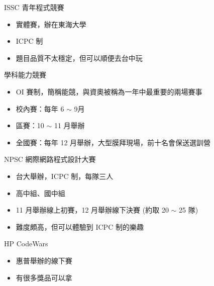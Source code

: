 \documentclass[aspectratio=169]{beamer}
\begin{document}
	\begin{frame}{ISSC 青年程式競賽}
		\begin{itemize}
			\item 實體賽，辦在東海大學
			\item ICPC 制
			\item 題目品質不太穩定，但可以順便去台中玩
		\end{itemize}
	\end{frame}

	\begin{frame}{學科能力競賽}
		\begin{itemize}
			\item OI 賽制，簡稱能競，與資奧被稱為一年中最重要的兩場賽事
			\item 校內賽：每年 6 $\sim$ 9月
			\item 區賽：10 $\sim$ 11 月舉辦
			\item 全國賽：每年 12 月舉辦，大型膜拜現場，前十名會保送選訓營
		\end{itemize}
	\end{frame}
	
	\begin{frame}{NPSC 網際網路程式設計大賽}
		\begin{itemize}
			\item<1-> 台大舉辦，ICPC 制，每隊三人
			\item<2-> 高中組、國中組
			\item<3-> 11 月舉辦線上初賽，12 月舉辦線下決賽 (約取 20 $\sim$ 25 隊)
			\item<4-> 難度頗高，但可以體驗到 ICPC 制的樂趣
		\end{itemize}
	\end{frame}

	\begin{frame}{HP CodeWars}
		\begin{itemize}
			\item<1-> 惠普舉辦的線下賽
			\item<2-> 有很多獎品可以拿
		\end{itemize}
	\end{frame}
\end{document}
